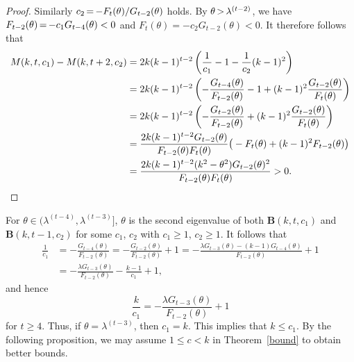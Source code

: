 \documentclass[ALCO,ThmDefs,Unicode,epreuves]{cedram}
\newcommand*{\Mk}{\mkern -2mu}
\begin{document}
\begin{proof}
\noindent
Similarly $c_2\Mk =\Mk -F_{t}(\theta)/G_{t-2}(\theta)$ holds. 
By $\theta \Mk >\Mk  \lambda^{(t-2)}$, we have $F_{t-2}(\theta)\Mk =\Mk -c_1 G_{t-4}(\theta)<0$ and $F_{t}(\theta)=-c_2G_{t-2}(\theta)<0$. 
It therefore follows that 
\begin{align*}
M(k,t,c_1)-M(k,t+2,c_2) 
& =2k(k-1)^{t-2}\left(\frac{1}{c_1}-1-\frac{1}{c_2}(k-1)^2\right)\\
&= 2k(k-1)^{t-2}\left(-\frac{G_{t-4}(\theta)}{F_{t-2}(\theta)}-1+(k-1)^2\frac{G_{t-2}(\theta)}{F_{t}(\theta)}\right)\\
&= 2k(k-1)^{t-2}\left(-\frac{G_{t-2}(\theta)}{F_{t-2}(\theta)}+(k-1)^2\frac{G_{t-2}(\theta)}{F_{t}(\theta)}\right)\\
&=\frac{2k(k-1)^{t-2}G_{t-2}(\theta)}{F_{t-2}(\theta)F_{t}(\theta)}\big(-F_{t}(\theta)+(k-1)^2F_{t-2}(\theta) \big)\\
&=\frac{2k(k-1)^{t-2}(k^2-\theta^2)G_{t-2}(\theta)^2}{F_{t-2}(\theta)F_{t}(\theta)}>0. \qquad \qedhere
\end{align*}
\end{proof}
For $\theta \in ( \lambda^{(t-4)}, \lambda^{(t-3)}]$, $\theta$ is the second eigenvalue of both $\boldsymbol{B}(k,t,c_1)$ and $\boldsymbol{B}(k,t-1,c_2)$ for some $c_1$, $c_2$ with $c_1 \geq 1$, $c_2 \geq 1$. It follows that 
\begin{align*}
\frac{1}{c_1}&=-\frac{G_{t-4}(\theta)}{F_{t-2}(\theta)}= -\frac{G_{t-2}(\theta)}{F_{t-2}(\theta)}+1
=-\frac{\lambda G_{t-3}(\theta)-(k-1)G_{t-4}(\theta)}{F_{t-2}(\theta)}+1
\\
&=-\frac{\lambda G_{t-3}(\theta)}{F_{t-2}(\theta)}-\frac{k-1}{c_1}+1,
\end{align*}
and hence
\begin{equation} 
\label{eq:k/c}
\frac{k}{c_1}=-\frac{\lambda G_{t-3}(\theta)}{F_{t-2}(\theta)}+1
\end{equation}
for $t\geq 4$. Thus, 
if $\theta=\lambda^{(t-3)}$, then $c_1=k$. This implies that $k \leq c_1$. 
By the following proposition, we may assume $1 \leq c < k$ in Theorem~\ref{bound} to obtain better bounds. 
\end{document}

